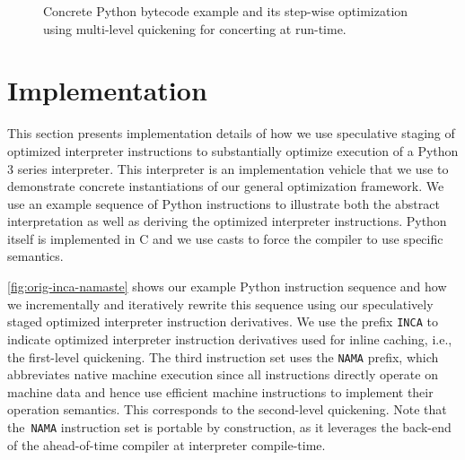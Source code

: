 \documentclass[preprint,10pt]{popl14conf}
\begin{document}
\begin{figure*}[t!]
  \caption{Concrete Python bytecode example and its step-wise optimization using multi-level
    quickening for concerting at run-time.}
  \label{fig:orig-inca-namaste}
\end{figure*}


\section{Implementation}\label{s:implementation}

This section presents implementation details of how we use speculative staging of optimized
interpreter instructions to substantially optimize execution of a Python 3 series interpreter.
This interpreter is an implementation vehicle that we use to demonstrate concrete instantiations of
our general optimization framework.
We use an example sequence of Python instructions to illustrate both the abstract interpretation as
well as deriving the optimized interpreter instructions.
Python itself is implemented in C and we use casts to force the compiler to use specific semantics.

\autoref{fig:orig-inca-namaste} shows our example Python instruction sequence and how we
incrementally and iteratively rewrite this sequence using our speculatively staged optimized
interpreter instruction derivatives.
We use the prefix \texttt{INCA} to indicate optimized interpreter instruction derivatives used for
inline caching, i.e., the first-level quickening.
The third instruction set uses the \texttt{NAMA} prefix, which abbreviates native machine execution
since all instructions directly operate on machine data and hence use efficient machine instructions
to implement their operation semantics.
This corresponds to the second-level quickening.
Note that the~\texttt{NAMA} instruction set is portable by construction, as it leverages the
back-end of the ahead-of-time compiler at interpreter compile-time.
\end{document}
